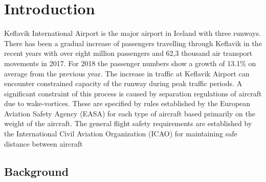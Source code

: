 \chapter{Introduction\label{cha:introduction}}

Keflavik International Airport is the major airport in Iceland with three runways. There has been a gradual increase of passengers travelling through Keflavik in the recent years with over eight million passengers and 62,3 thousand air transport movements in 2017\cite{isavia_facts_2017}. For 2018 the passenger numbers show a growth of 13.1\% on average from the previous year\cite{isavia_pass_statistics_2018}. The increase in traffic at Keflavik Airport can encounter constrained capacity of the runway during peak traffic periods. 
A significant constraint of this process is caused by separation regulations of aircraft due to wake-vortices. These are specified by rules established by the European Aviation Safety Agency (EASA)  for each type of aircraft based primarily on the weight of the aircraft. The general flight safety requirements are established by the International Civil Aviation Organization (ICAO) for maintaining safe distance between aircraft

\section{Background}

